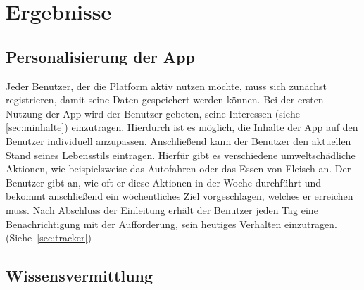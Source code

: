 \documentclass[../main.tex]{subfiles}
\begin{document}
    \chapter{Ergebnisse}


    \section{Personalisierung der App}\label{sec:personalization}
    Jeder Benutzer, der die Platform aktiv nutzen möchte, muss sich zunächst registrieren, damit seine Daten gespeichert werden können.
    Bei der ersten Nutzung der App wird der Benutzer gebeten, seine Interessen (siehe \ref{sec:minhalte}) einzutragen.
    Hierdurch ist es möglich, die Inhalte der App auf den Benutzer individuell anzupassen.
    Anschließend kann der Benutzer den aktuellen Stand seines Lebensstils eintragen.
    Hierfür gibt es verschiedene umweltschädliche Aktionen, wie beispielsweise das Autofahren oder das Essen von Fleisch an.
    Der Benutzer gibt an, wie oft er diese Aktionen in der Woche durchführt und
    bekommt anschließend ein wöchentliches Ziel vorgeschlagen, welches er erreichen muss.
    Nach Abschluss der Einleitung erhält der Benutzer jeden Tag eine Benachrichtigung mit der Aufforderung, sein heutiges Verhalten einzutragen.
    (Siehe\ \ref{sec:tracker})


    \section{Wissensvermittlung}\label{sec:knowledge}
\end{document}
